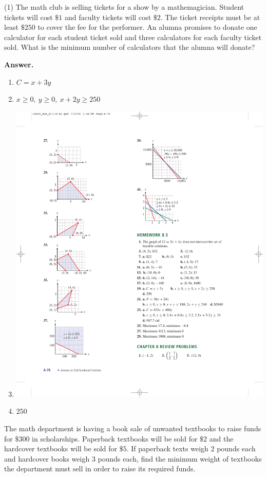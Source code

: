\documentclass[10pt,]{book}
\theoremstyle{plain}
\theoremstyle{definition}
\theoremstyle{definition}
\theoremstyle{definition}
\numberwithin{equation}{part}
\begin{document}
\begin{exercisegroup}(1)
\exercise[19.]\hypertarget{exercise-23}{}The math club is selling tickets for a show by a mathemagician. Student tickets will cost \(\$1\) and faculty tickets will cost \(\$2\). The ticket receipts must be at least \(\$250\) to cover the fee for the performer. An alumna promises to donate one calculator for each student ticket sold and three calculators for each faculty ticket sold. What is the minimum number of calculators that the alumna will donate?%
\par\smallskip
\noindent\textbf{Answer.}\hypertarget{answer-14}{}\quad
\leavevmode%
\begin{multicols}{2}
\begin{enumerate}[label=(\alph*)]
\item\hypertarget{li-73}{}\(C = x + 3y\)%
\item\hypertarget{li-74}{}\(x \ge 0, ~y \ge 0, ~x + 2y \ge 250\)%
\item\hypertarget{li-75}{}\includegraphics[width=0.8\linewidth]{images/fig-ans-8-4-37}
%
\item\hypertarget{li-76}{}\(250\)%
\end{enumerate}
\end{multicols}
%
\exercise[20.]\hypertarget{exercise-24}{}The math department is having a book sale of unwanted textbooks to raise funds for \(\$300\) in scholarships. Paperback textbooks will be sold for \(\$2\) and the hardcover textbooks will be sold for \(\$5\). If paperback texts weigh \(2\) pounds each and hardcover books weigh \(3\) pounds each, find the minimum weight of textbooks the department must sell in order to raise its required funds.%

\end{exercisegroup}
\end{document}
